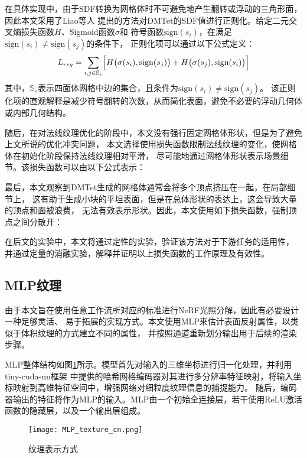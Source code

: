 在具体实现中，由于SDF转换为网格体时不可避免地产生翻转或浮动的三角形面，因此本文采用了Liao等人\cite{Liao_2018}
提出的方法对DMTet的SDF值进行正则化。给定二元交叉熵损失函数$H$、Sigmoid函数$\sigma$和
符号函数$\mathrm{sign}(s_i)$，在满足$\mathrm{sign}(s_i)\neq\mathrm{sign}(s_j)$的条件下，
正则化项可以通过以下公式定义：
\begin{equation}\label{eq:Lreg}
L_{reg}=\sum_{i,j\in\mathbb{S}_e}\Bigl[H\bigl(\sigma(s_i),\mathrm{sign}(s_j)\bigr)+H\bigl(\sigma(s_j),\mathrm{sign}(s_i)\bigr)\Bigr]
\end{equation}
其中，$\mathbb{S}_e$表示四面体网格中边的集合，且条件为$\mathrm{sign}(s_i)\neq\mathrm{sign}(s_j)$。
该正则化项的直观解释是减少符号翻转的次数，从而简化表面，避免不必要的浮动几何体或内部几何结构。

随后，在对法线纹理优化的阶段中，本文没有强行固定网格体形状，但是为了避免上文所说的优化冲突问题，
本文选择使用损失函数限制法线纹理的变化，使网格体在初始化阶段保持法线纹理相对平滑，
尽可能地通过网格体形状表示场景细节。该损失函数可以由以下公式表示：

最后，本文观察到DMTet生成的网格体通常会将多个顶点挤压在一起，在局部细节上，
这有助于生成小块的平坦表面，但是在总体形状的表达上，这会导致大量的顶点和面被浪费，
无法有效表示形状。因此，本文使用如下损失函数，强制顶点之间分散开：

在后文的实验中，本文将通过定性的实验，验证该方法对于下游任务的适用性，
并通过定量的消融实验，解释并证明以上损失函数的工作原理及有效性。

\subsection{MLP纹理} \label{sec:mlp_texture}
由于本文旨在使用任意工作流所对应的标准进行NeRF光照分解，因此有必要设计一种足够灵活、
易于拓展的实现方式。本文使用MLP来估计表面反射属性，以类似于体积纹理的方式建立不同的属性，
并按照通道重新划分输出用于后续的渲染步骤。

MLP整体结构如图\ref{fig:mlp_texture_cn}所示。模型首先对输入的三维坐标进行归一化处理，并利用tiny-cuda-nn框架\cite{Muller_tiny-cuda-nn_2021}
中提供的哈希网格编码器对其进行多分辨率特征映射，将输入坐标映射到高维特征空间中，增强网络对细粒度纹理信息的捕捉能力。
随后，编码器输出的特征将作为MLP的输入。MLP由一个初始全连接层，若干使用ReLU激活函数的隐藏层，以及一个输出层组成。
\begin{figure}[htb]
  \centering
  \texttt{[image: MLP\_texture\_cn.png]}
  \caption{纹理表示方式}
  \label{fig:mlp_texture_cn}
\end{figure}

